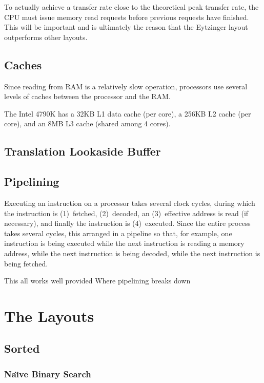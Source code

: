 \documentclass{patmorin}
\begin{document}
To actually achieve a transfer rate close to the theoretical peak transfer
rate, the CPU must issue memory read requests before previous requests
have finished.  This will be important and is ultimately the reason that
the Eytzinger layout outperforms other layouts.

\subsection{Caches}

Since reading from RAM is a relatively slow operation, processors use
several levels of caches between the processor and the RAM.

The Intel 4790K has a 32KB L1 data cache (per core), a 256KB L2 cache
(per core), and an 8MB L3 cache (shared among 4 cores).  

\subsection{Translation Lookaside Buffer}

\subsection{Pipelining}

Executing an instruction on a processor takes several clock cycles, during
which the instruction is (1)~fetched, (2)~decoded, an (3)~effective
address is read (if necessary), and finally the instruction is
(4)~executed.  Since the entire process takes several cycles, this
arranged in a pipeline so that, for example, one instruction is being
executed while the next instruction is reading a memory address, while
the next instruction is being decoded, while the next instruction is
being fetched.

This all works well provided 
Where pipelining breaks down

\section{The Layouts}

\subsection{Sorted}

\subsubsection{Na\"{\i}ve Binary Search}
\end{document}
